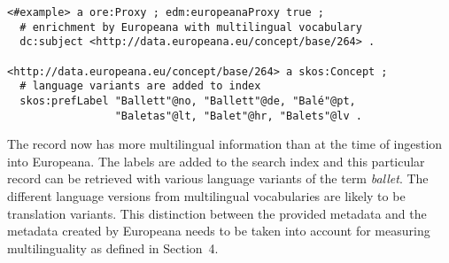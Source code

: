 \begingroup
   \fontsize{8pt}{10pt}\selectfont
\begin{verbatim}
<#example> a ore:Proxy ; edm:europeanaProxy true ;
  # enrichment by Europeana with multilingual vocabulary
  dc:subject <http://data.europeana.eu/concept/base/264> . 
 
<http://data.europeana.eu/concept/base/264> a skos:Concept ;
  # language variants are added to index
  skos:prefLabel "Ballett"@no, "Ballett"@de, "Balé"@pt, 
                 "Baletas"@lt, "Balet"@hr, "Balets"@lv .
\end{verbatim}
\endgroup
The record now has more multilingual information than at the time of ingestion into Europeana. The labels are added to the search index and this particular record can be retrieved with various language variants of the term \textit{ballet}. The different language versions from multilingual vocabularies are likely to be translation variants. This distinction between the provided metadata and the metadata created by Europeana needs to be taken into account for measuring multilinguality as defined in Section~4. 



